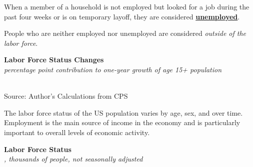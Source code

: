 \documentclass{report}
\makeatletter
\newcommand{\tbllink}[1]{\href{https://raw.githubusercontent.com/bdecon/US-chartbook/master/chartbook/data/#1}{\faTable}}
\newcommand*\short[1]{\expandafter\@gobbletwo\number\numexpr#1\relax}
\newcommand{\ctsbar}[5]{
		\addplot[ybar stacked, bar width=#5, draw opacity=0, fill=#1] 
			table [x=#2, y=#3, col sep=comma]{#4};}
\newcommand{\dateaxisticks}{
		date coordinates in=x, axis line style={draw=none},
		xmax={2023-11-01},
		max space between ticks=40,	    
		xtick={{1990-01-01}, {1992-01-01}, {1994-01-01}, 
			{1996-01-01}, {1998-01-01}, {2000-01-01}, 
			{2002-01-01}, {2004-01-01}, {2006-01-01},
			{2008-01-01}, {2010-01-01}, {2012-01-01}, {2014-01-01},
		    {2016-01-01}, {2018-01-01}, {2020-01-01}, {2022-01-01}, 
		    {2024-01-01}, {2026-01-01}},
		minor xtick={{1989-01-01}, {1991-01-01}, {1993-01-01},
			{1995-01-01}, {1997-01-01}, {1999-01-01}, 
			{2001-01-01}, {2003-01-01}, {2005-01-01}, {2007-01-01},
		    {2009-01-01}, {2011-01-01}, {2013-01-01}, {2015-01-01},
		    {2017-01-01}, {2019-01-01}, {2021-01-01}, {2023-01-01}, 
		    {2025-01-01}, {2027-01-01}},
		enlarge y limits={0.06}, enlarge x limits={0.01},
		}
\newcommand{\bbar}[2]{extra #1 ticks = {{#2}}, extra #1 tick labels = ,
		extra #1 tick style = {grid=major, grid style={thick, black!25}},}
\newcommand{\rbars}{
		\fill[color=black!10] (axis cs:{1990-07-01},\pgfkeysvalueof{/pgfplots/ymin}) rectangle 
			(axis cs:{1991-03-01}, \pgfkeysvalueof{/pgfplots/ymax});
		\fill[color=black!10] (axis cs:{2007-12-01},\pgfkeysvalueof{/pgfplots/ymin}) rectangle 
			(axis cs:{2009-07-01}, \pgfkeysvalueof{/pgfplots/ymax});
		\fill[color=black!10] (axis cs:{2001-03-01},\pgfkeysvalueof{/pgfplots/ymin}) rectangle 
			(axis cs:{2001-11-01}, \pgfkeysvalueof{/pgfplots/ymax});
		\fill[color=black!10] (axis cs:{2020-02-01},\pgfkeysvalueof{/pgfplots/ymin}) rectangle 
			(axis cs:{2020-05-01}, \pgfkeysvalueof{/pgfplots/ymax});}
\makeatother
\begin{document}
{\begin{minipage}{0.76\textwidth}
\small When a member of a household is not employed but looked for a job during the past four weeks or is on temporary layoff, they are considered \href{https://www.bls.gov/cps/cps_htgm.htm}{\textbf{unemployed}}. 

People who are neither employed nor unemployed are considered \textit{outside of the labor force}.  
\vspace{1mm}

\normalsize \textbf{Labor Force Status Changes}\\
\footnotesize{\textit{percentage point contribution to one-year growth of age 15+ population}}\\
\hspace*{-2mm} \\
\footnotesize{Source: Author's Calculations from CPS} \hfill \tbllink{cps_lfs2.csv}
\end{minipage}
\newpage
\begin{minipage}{0.76\textwidth} 
\small The labor force status of the US population varies by age, sex, and over time. Employment is the main source of income in the economy and is particularly important to overall levels of economic activity. 
\vspace{1mm}

\normalsize \textbf{Labor Force Status}\\
\footnotesize{\textit{\unskip, thousands of people, not seasonally adjusted}}\\
\noindent {} \setlength{\tabcolsep}{3.0pt} \color{black!90}
		{\renewcommand{\arraystretch}{1.5}
		 \begin{tabular}{p{27.8mm} R{11.2mm} R{10.4mm} R{10.4mm} R{10.2mm} 
		 				 R{10.6mm} R{10.4mm} R{10.4mm}}
			  \hline
		\end{tabular}}
\vspace{-3mm}	
	

\end{minipage}}
\end{document}
